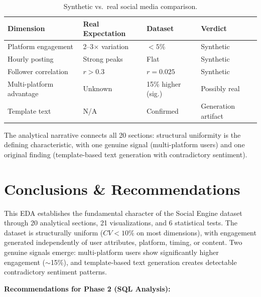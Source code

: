 \documentclass[11pt,a4paper]{article}
\begin{document}
\begin{table}[H]
\centering
\small
\begin{tabular}{@{}llll@{}}
\toprule
\textbf{Dimension} & \textbf{Real Expectation} & \textbf{Dataset} & \textbf{Verdict} \\
\midrule
Platform engagement & 2--3$\times$ variation & $<5\%$ & Synthetic \\
Hourly posting & Strong peaks & Flat & Synthetic \\
Follower correlation & $r > 0.3$ & $r = 0.025$ & Synthetic \\
Multi-platform advantage & Unknown & 15\% higher (sig.) & Possibly real \\
Template text & N/A & Confirmed & Generation artifact \\
\bottomrule
\end{tabular}
\caption{Synthetic vs.\ real social media comparison.}
\end{table}

\begin{insightbox}
The analytical narrative connects all 20 sections: structural uniformity is the defining characteristic, with one genuine signal (multi-platform users) and one original finding (template-based text generation with contradictory sentiment).
\end{insightbox}

\section*{Conclusions \& Recommendations}

This EDA establishes the fundamental character of the Social Engine dataset through 20 analytical sections, 21 visualizations, and 6 statistical tests. The dataset is structurally uniform ($CV < 10\%$ on most dimensions), with engagement generated independently of user attributes, platform, timing, or content. Two genuine signals emerge: multi-platform users show significantly higher engagement ($\sim$15\%), and template-based text generation creates detectable contradictory sentiment patterns.

\textbf{Recommendations for Phase 2 (SQL Analysis):}
\end{document}
